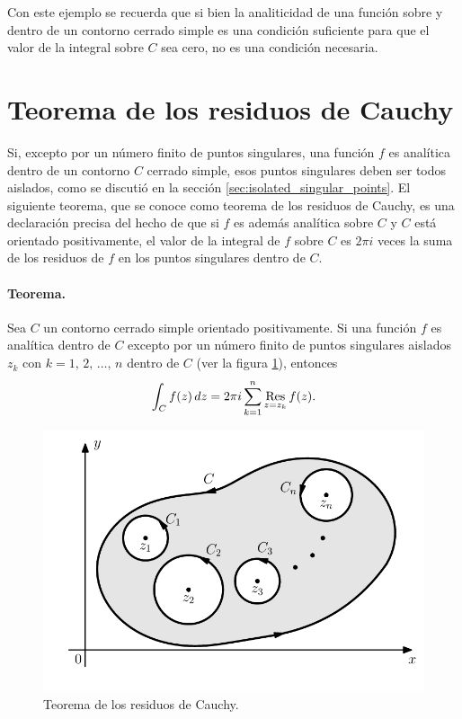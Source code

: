 \documentclass[a4paper]{report}
\def\Res{\qopname\relax m{Res}}
\begin{document}
Con este ejemplo se recuerda que si bien la analiticidad de una función sobre y dentro de un contorno cerrado simple es una condición suficiente para que el valor de la integral sobre \(C\) sea cero, no es una condición necesaria.

\section{Teorema de los residuos de Cauchy}\label{sec:cauchy_residues_theorem}

Si, excepto por un número finito de puntos singulares, una función \(f\) es analítica dentro de un contorno \(C\) cerrado simple, esos puntos singulares deben ser todos aislados, como se discutió en la sección \ref{sec:isolated_singular_points}. El siguiente teorema, que se conoce como teorema de los residuos de Cauchy, es una declaración precisa del hecho de que si \(f\) es además analítica sobre \(C\) y \(C\) está orientado positivamente, el valor de la integral de \(f\) sobre \(C\) es \(2\pi i\) veces la suma de los residuos de \(f\) en los puntos singulares dentro de \(C\).

\paragraph{Teorema.} Sea \(C\) un contorno cerrado simple orientado positivamente. Si una función \(f\) es analítica dentro de \(C\) excepto por un número finito de puntos singulares aislados \(z_k\) con \(k=1,\,2,\,\dots,\,n\) dentro de \(C\) (ver la figura \ref{fig:cauchy_residue_theorem}), entonces
\begin{equation}\label{eq:cauchy_residue_theorem}
 \int_C f(z)\,dz=2\pi i\sum_{k=1}^n \Res_{z=z_k}f(z). 
\end{equation}
\begin{figure}[!htb]
  \begin{minipage}[c]{0.6\textwidth}
    \includegraphics[width=\textwidth]{figuras/cauchy_residue_theorem.pdf}
  \end{minipage}\hfill
  \begin{minipage}[c]{0.3\textwidth}
    \caption{
       Teorema de los residuos de Cauchy. 
    }\label{fig:cauchy_residue_theorem}
  \end{minipage}
\end{figure}
\end{document}
